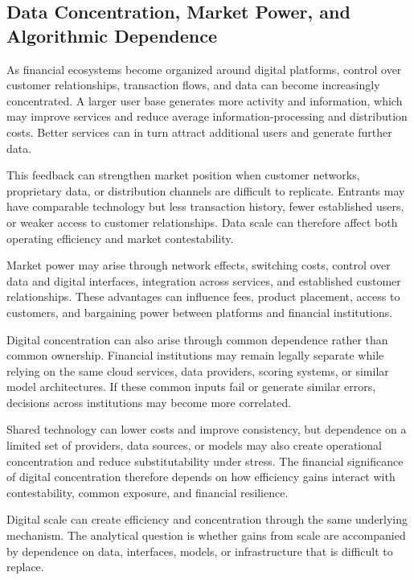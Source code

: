 \subsection[Data Concentration, Market Power, and Algorithmic Dependence]{Data Concentration, Market Power, and Algorithmic Dependence}

As financial ecosystems become organized around digital platforms, control over customer relationships, transaction flows, and data can become increasingly concentrated. A larger user base generates more activity and information, which may improve services and reduce average information-processing and distribution costs. Better services can in turn attract additional users and generate further data.

This feedback can strengthen market position when customer networks, proprietary data, or distribution channels are difficult to replicate. Entrants may have comparable technology but less transaction history, fewer established users, or weaker access to customer relationships. Data scale can therefore affect both operating efficiency and market contestability.

Market power may arise through network effects, switching costs, control over data and digital interfaces, integration across services, and established customer relationships. These advantages can influence fees, product placement, access to customers, and bargaining power between platforms and financial institutions.

Digital concentration can also arise through common dependence rather than common ownership. Financial institutions may remain legally separate while relying on the same cloud services, data providers, scoring systems, or similar model architectures. If these common inputs fail or generate similar errors, decisions across institutions may become more correlated.

Shared technology can lower costs and improve consistency, but dependence on a limited set of providers, data sources, or models may also create operational concentration and reduce substitutability under stress. The financial significance of digital concentration therefore depends on how efficiency gains interact with contestability, common exposure, and financial resilience.

\begin{tcolorbox}[
  enhanced,
  breakable,
  colback=white,
  colframe=FinanceBlue,
  boxrule=0.7pt,
  sharp corners,
  borderline west={2.2pt}{0pt}{FinanceBlue},
  title=\textbf{Financial Perspective: Digital Scale Can Reduce Cost and Concentrate Dependence},
  coltitle=white,
  colbacktitle=FinanceBlue,
  fonttitle=\bfseries,
  before skip=1.2em,
  after skip=1.2em
]

Digital scale can create efficiency and concentration through the same underlying mechanism. The analytical question is whether gains from scale are accompanied by dependence on data, interfaces, models, or infrastructure that is difficult to replace.

\end{tcolorbox}

